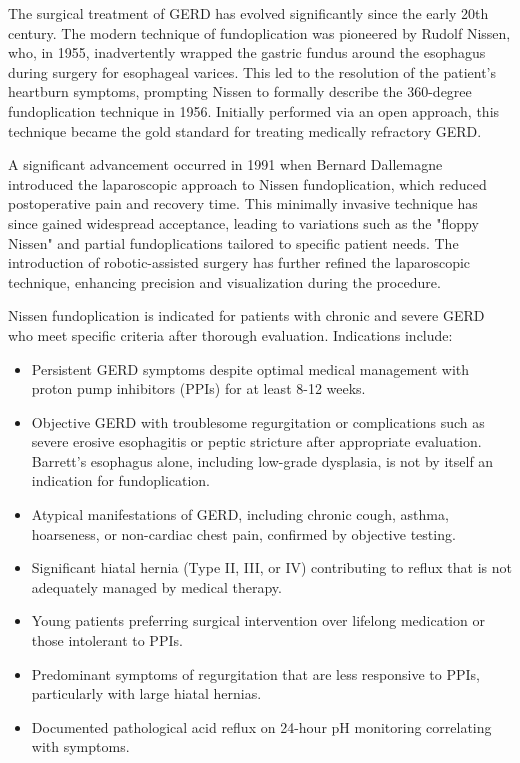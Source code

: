 The surgical treatment of GERD has evolved significantly since the early 20th century. The modern technique of fundoplication was pioneered by Rudolf Nissen, who, in 1955, inadvertently wrapped the gastric fundus around the esophagus during surgery for esophageal varices. This led to the resolution of the patient's heartburn symptoms, prompting Nissen to formally describe the 360-degree fundoplication technique in 1956. Initially performed via an open approach, this technique became the gold standard for treating medically refractory GERD.

A significant advancement occurred in 1991 when Bernard Dallemagne introduced the laparoscopic approach to Nissen fundoplication, which reduced postoperative pain and recovery time. This minimally invasive technique has since gained widespread acceptance, leading to variations such as the "floppy Nissen" and partial fundoplications tailored to specific patient needs. The introduction of robotic-assisted surgery has further refined the laparoscopic technique, enhancing precision and visualization during the procedure.

Nissen fundoplication is indicated for patients with chronic and severe GERD who meet specific criteria after thorough evaluation. Indications include:

\begin{itemize}
  \item Persistent GERD symptoms despite optimal medical management with proton pump inhibitors (PPIs) for at least 8-12 weeks.
  \item Objective GERD with troublesome regurgitation or complications such as severe erosive esophagitis or peptic stricture after appropriate evaluation. Barrett's esophagus alone, including low-grade dysplasia, is not by itself an indication for fundoplication.
  \item Atypical manifestations of GERD, including chronic cough, asthma, hoarseness, or non-cardiac chest pain, confirmed by objective testing.
  \item Significant hiatal hernia (Type II, III, or IV) contributing to reflux that is not adequately managed by medical therapy.
  \item Young patients preferring surgical intervention over lifelong medication or those intolerant to PPIs.
  \item Predominant symptoms of regurgitation that are less responsive to PPIs, particularly with large hiatal hernias.
  \item Documented pathological acid reflux on 24-hour pH monitoring correlating with symptoms.
\end{itemize}

